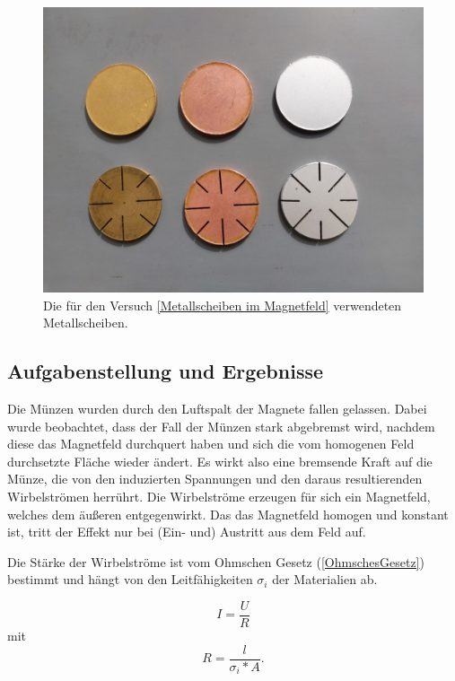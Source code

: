 \documentclass[a4paper,twoside,12pt,DIV=13,BCOR=5mm,numbers=noenddot,cleardoublepage=empty]{scrbook}
\begin{document}
\begin{figure}
    \centering
    \includegraphics[scale=0.4]{pictures/Metallscheiben.pdf}
    \caption{Die für den Versuch \ref{Metallscheiben im Magnetfeld} verwendeten Metallscheiben.}
    \label{fig: Metallscheiben}
\end{figure}
\subsection{Aufgabenstellung und Ergebnisse}
Die Münzen wurden durch den Luftspalt der Magnete fallen gelassen. Dabei wurde beobachtet, dass der Fall der Münzen stark abgebremst wird, nachdem diese das Magnetfeld durchquert haben und sich die vom homogenen Feld durchsetzte Fläche wieder ändert. Es wirkt also eine bremsende Kraft auf die Münze, die von den induzierten Spannungen und den daraus resultierenden Wirbelströmen herrührt. Die Wirbelströme erzeugen für sich ein Magnetfeld, welches dem äußeren entgegenwirkt. Das das Magnetfeld homogen und konstant ist, tritt der Effekt nur bei (Ein- und) Austritt aus dem Feld auf. 

\noindent Die Stärke der Wirbelströme ist vom Ohmschen Gesetz (\ref{OhmschesGesetz}) bestimmt und hängt von den Leitfähigkeiten $\sigma_i$ der Materialien ab.

\begin{equation}
	I = \frac{U}{R}
	\label{OhmschesGesetz}
\end{equation}
mit 
\begin{equation}
    R = \frac{l}{\sigma_i*A}.
    \label{SpezifischerWiderstand}
\end{equation}
\end{document}
